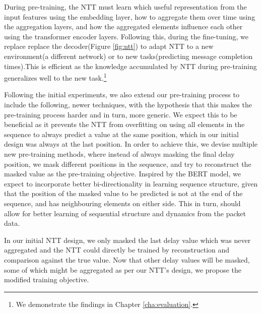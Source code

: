During pre-training, the NTT must learn which useful representation from the input features using the embedding layer, how to aggregate them over time using the aggregation layers, and how the aggregated elements influence each other using the transformer encoder layers. Following this, during the fine-tuning, we replace replace the decoder(Figure \ref{fig:ntt}) to adapt NTT to a new environment(\eg a different network) or to new tasks(\eg predicting message completion times).This is efficient as the knowledge accumulated by NTT during pre-training generalizes well to the new task.\footnote{We demonstrate the findings in Chapter \ref{cha:evaluation}.}

Following the initial experiments, we also extend our pre-training process to include the following, newer techniques, with the hypothesis that this makes the pre-training process harder and in turn, more generic. We expect this to be beneficial as it prevents the NTT from overfitting on using all elements in the sequence to always predict a value at the same position, which in our initial design was always at the last position. In order to achieve this, we devise multiple new pre-training methods, where instead of always masking the final delay position, we mask different positions in the sequence, and try to reconstruct the masked value as the pre-training objective. Inspired by the BERT\cite{devlinBERTPretrainingDeep2019} model, we expect to incorporate better bi-directionality in learning sequence structure, given that the position of the masked value to be predicted is not at the end of the sequence, and has neighbouring elements on either side. This in turn, should allow for better learning of sequential structure and dynamics from the packet data.

In our initial NTT design, we only masked the last delay value which was never aggregated and the NTT could directly be trained by reconstruction and comparison against the true value. Now that other delay values will be masked, some of which might be aggregated as per our NTT's design, we propose the modified training objective.

